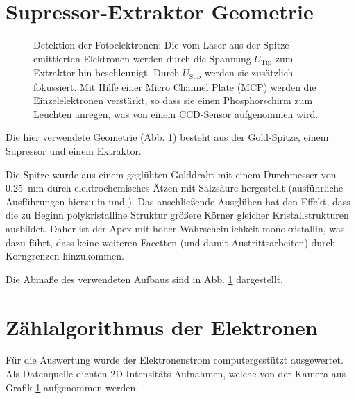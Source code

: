 \documentclass[bachelor,       %
               twoside,        %
               BCOR10mm,       %
               english,ngerman, %
               ]{GAUBM}
\begin{document}
\section{Supressor-Extraktor Geometrie}
\begin{figure}[h!]
	\centering
	\def\svgwidth{0.8\textwidth}
	
	\caption{Detektion der Fotoelektronen: Die vom Laser aus der Spitze emittierten Elektronen werden durch die Spannung $U_\text{Tip}$ zum Extraktor hin beschleunigt. Durch $U_\text{Sup}$ werden sie zusätzlich fokussiert. Mit Hilfe einer Micro Channel Plate (MCP) werden die Einzelelektronen verstärkt, so dass sie einen Phosphorschirm zum Leuchten anregen, was von einem CCD-Sensor aufgenommen wird.}
	\label{fig:aufbau_kammer}
\end{figure}
Die hier verwendete Geometrie (Abb. \ref{fig:aufbau_kammer}) besteht aus der Gold-Spitze, einem Supressor und einem Extraktor.

Die Spitze wurde aus einem geglühten Golddraht mit einem Durchmesser von \SI{0.25}{\mm} durch elektrochemisches Ätzen mit Salzsäure hergestellt (ausführliche Ausführungen hierzu in \cite{schmidt_2012} und \cite{neacsu_2007}).
Das anschlie{\ss}ende Ausglühen hat den Effekt, dass die zu Beginn polykristalline Struktur größere Körner gleicher Kristallstrukturen ausbildet.
Daher ist der Apex mit hoher Wahrscheinlichkeit monokristallin, was dazu führt, dass keine weiteren Facetten (und damit Austrittsarbeiten) durch Korngrenzen hinzukommen.

Die Abma{\ss}e des verwendeten Aufbaus sind in Abb. \ref{fig:aufbau_kammer} dargestellt.


\section{Zählalgorithmus der Elektronen}
\label{sec:zaehlalgorithmus}
Für die Auswertung wurde der Elektronenstrom computergestützt ausgewertet.
Als Datenquelle dienten 2D-Intensitäts-Aufnahmen, welche von der Kamera aus Grafik \ref{fig:aufbau_kammer} aufgenommen werden.
\end{document}

